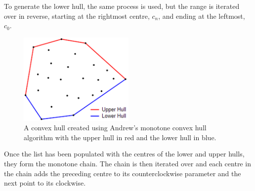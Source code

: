 \\
\\
To generate the lower hull, the same process is used, but the range is iterated over in reverse, starting at the rightmost centre, $c_n$, and ending at the leftmost, $c_0$.
\begin{figure}[H]
\centering
\includegraphics[width=0.5\textwidth]{Images/andrewmonotone.png}
\caption[]{A convex hull created using Andrew's monotone convex hull algorithm with the upper hull in red and the lower hull in blue\footnotemark.}
\label{fig:andrewmonotone}
\end{figure}
Once the list has been populated with the centres of the lower and upper hulls, they form the monotone chain. The chain is then iterated over and each centre in the chain adds the preceding centre to its counterclockwise parameter and the next point to its clockwise.

